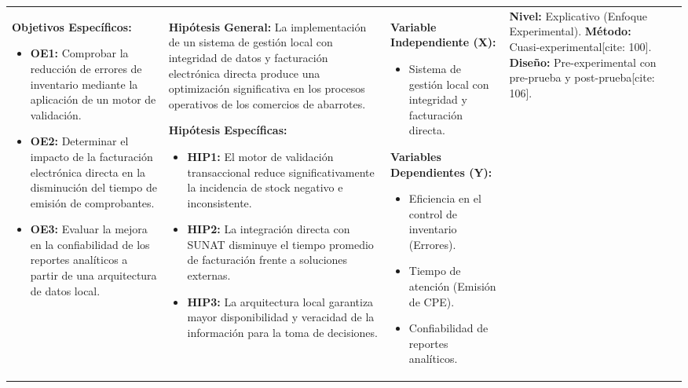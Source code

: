\begin{landscape}
\begin{tabularx}{\linewidth}{|Y|Y|Y|Y|Y|}
\textbf{Objetivos Específicos:}
\begin{itemize}[leftmargin=*, nosep, itemsep=6pt]
    \item \textbf{OE1:} Comprobar la reducción de errores de inventario mediante la aplicación de un motor de validación.
    \item \textbf{OE2:} Determinar el impacto de la facturación electrónica directa en la disminución del tiempo de emisión de comprobantes.
    \item \textbf{OE3:} Evaluar la mejora en la confiabilidad de los reportes analíticos a partir de una arquitectura de datos local.
\end{itemize} 
& 
\textbf{Hipótesis General:} \newline
La implementación de un sistema de gestión local con integridad de datos y facturación electrónica directa produce una optimización significativa en los procesos operativos de los comercios de abarrotes. \newline

\textbf{Hipótesis Específicas:}
\begin{itemize}[leftmargin=*, nosep, itemsep=6pt]
    \item \textbf{HIP1:} El motor de validación transaccional reduce significativamente la incidencia de stock negativo e inconsistente.
    \item \textbf{HIP2:} La integración directa con SUNAT disminuye el tiempo promedio de facturación frente a soluciones externas.
    \item \textbf{HIP3:} La arquitectura local garantiza mayor disponibilidad y veracidad de la información para la toma de decisiones.
\end{itemize} 
& 
\textbf{Variable Independiente (X):}
\begin{itemize}[leftmargin=*, nosep, itemsep=2pt]
    \item Sistema de gestión local con integridad y facturación directa.
\end{itemize}

\textbf{Variables Dependientes (Y):}
\begin{itemize}[leftmargin=*, nosep, itemsep=2pt]
    \item Eficiencia en el control de inventario (Errores).
    \item Tiempo de atención (Emisión de CPE).
    \item Confiabilidad de reportes analíticos.
\end{itemize} 
& 
\textbf{Nivel:} Explicativo (Enfoque Experimental). \newline
\textbf{Método:} Cuasi-experimental[cite: 100]. \newline
\textbf{Diseño:} Pre-experimental con pre-prueba y post-prueba[cite: 106]. \newline


\end{tabularx}
\end{landscape}
